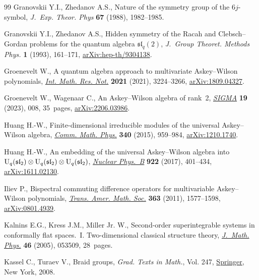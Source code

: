 \documentclass[pdftex]{sigma}
\numberwithin{equation}{section}
\theoremstyle{definition}
\begin{document}
\begin{thebibliography}{99}
Granovskii Y.I., Zhedanov A.S., Nature of the symmetry group of the
 {$6j$}-symbol, \textit{J.~Exp. Theor. Phys} \textbf{67} (1988), 1982--1985.

Granovskii Y.I., Zhedanov A.S., Hidden symmetry of the {R}acah and
 {C}lebsch--{G}ordan problems for the quantum algebra $\mathfrak{sl}_q(2)$,
 \textit{J.~Group Theoret. Methods Phys.} \textbf{1} (1993), 161--171,
 \href{https://arxiv.org/abs/hep-th/9304138}{arXiv:hep-th/9304138}.

Groenevelt W., A quantum algebra approach to multivariate {A}skey--{W}ilson
 polynomials, \href{https://doi.org/10.1093/imrn/rnz182}{\textit{Int. Math. Res. Not.}} \textbf{2021} (2021), 3224--3266,
 \href{https://arxiv.org/abs/1809.04327}{arXiv:1809.04327}.

Groenevelt W., Wagenaar C., An {A}skey--{W}ilson algebra of rank~2,
 \href{https://doi.org/10.3842/SIGMA.2023.008}{\textit{SIGMA}} \textbf{19} (2023), 008, 35~pages, \href{https://arxiv.org/abs/2206.03986}{arXiv:2206.03986}.

Huang H.-W., Finite-dimensional irreducible modules of the universal
 {A}skey--{W}ilson algebra, \href{https://doi.org/10.1007/s00220-015-2467-9}{\textit{Comm. Math. Phys.}} \textbf{340} (2015),
 959--984, \href{https://arxiv.org/abs/1210.1740}{arXiv:1210.1740}.

Huang H.-W., An embedding of the universal {A}skey--{W}ilson algebra into
 {${\rm U}_q(\mathfrak{sl}_2)\otimes {\rm U}_q(\mathfrak{sl}_2)\otimes
 {\rm U}_q(\mathfrak{sl}_2)$}, \href{https://doi.org/10.1016/j.nuclphysb.2017.07.007}{\textit{Nuclear Phys.~B}} \textbf{922} (2017),
 401--434, \href{https://arxiv.org/abs/1611.02130}{arXiv:1611.02130}.

Iliev P., Bispectral commuting difference operators for multivariable
 {A}skey--{W}ilson polynomials, \href{https://doi.org/10.1090/S0002-9947-2010-05183-9}{\textit{Trans. Amer. Math. Soc.}} \textbf{363}
 (2011), 1577--1598, \href{https://arxiv.org/abs/0801.4939}{arXiv:0801.4939}.

Kalnins E.G., Kress J.M., Miller Jr. W., Second-order superintegrable systems
 in conformally flat spaces.~{I}. {T}wo-dimensional classical structure
 theory, \href{https://doi.org/10.1063/1.1897183}{\textit{J.~Math. Phys.}} \textbf{46} (2005), 053509, 28~pages.

Kassel C., Turaev V., Braid groups, \textit{Grad. Texts in Math.}, Vol. 247,
 \href{https://doi.org/10.1007/978-0-387-68548-9}{Springer}, New York, 2008.


\end{thebibliography}
\end{document}
